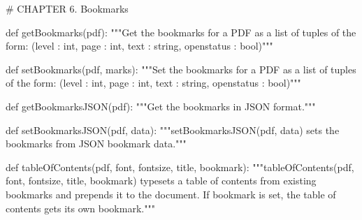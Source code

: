 # CHAPTER 6. Bookmarks

def getBookmarks(pdf):
    """Get the bookmarks for a PDF as a list of tuples of the form:
    (level : int, page : int, text : string, openstatus : bool)"""

def setBookmarks(pdf, marks):
    """Set the bookmarks for a PDF as a list of tuples of the form:
    (level : int, page : int, text : string, openstatus : bool)"""

def getBookmarksJSON(pdf):
    """Get the bookmarks in JSON format."""

def setBookmarksJSON(pdf, data):
    """setBookmarksJSON(pdf, data) sets the bookmarks from JSON bookmark data."""

def tableOfContents(pdf, font, fontsize, title, bookmark):
    """tableOfContents(pdf, font, fontsize, title, bookmark) typesets a table
    of contents from existing bookmarks and prepends it to the document. If
    bookmark is set, the table of contents gets its own bookmark."""
